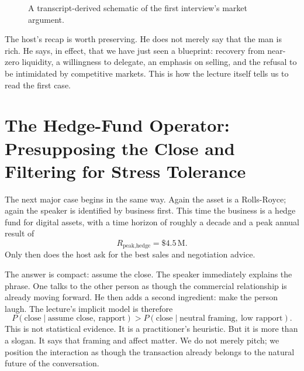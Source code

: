\begin{figure}
\centering
{}
\caption{A transcript-derived schematic of the first interview's market argument.}
\end{figure}

The host's recap is worth preserving. He does not merely say that the man is rich. He says, in effect, that we have just seen a blueprint: recovery from near-zero liquidity, a willingness to delegate, an emphasis on selling, and the refusal to be intimidated by competitive markets. This is how the lecture itself tells us to read the first case.

\section{The Hedge-Fund Operator: Presupposing the Close and Filtering for Stress Tolerance}

The next major case begins in the same way. Again the asset is a Rolls-Royce; again the speaker is identified by business first. This time the business is a hedge fund for digital assets, with a time horizon of roughly a decade and a peak annual result of
\begin{equation}
R_{\text{peak,hedge}} = \text{\$}4.5\,\mathrm{M}.
\end{equation}
Only then does the host ask for the best sales and negotiation advice.

The answer is compact: assume the close. The speaker immediately explains the phrase. One talks to the other person as though the commercial relationship is already moving forward. He then adds a second ingredient: make the person laugh. The lecture's implicit model is therefore
\begin{equation}
P(\text{close}\mid \text{assume close},\ \text{rapport})
>
P(\text{close}\mid \text{neutral framing},\ \text{low rapport}).
\end{equation}
This is not statistical evidence. It is a practitioner's heuristic. But it is more than a slogan. It says that framing and affect matter. We do not merely pitch; we position the interaction as though the transaction already belongs to the natural future of the conversation.

